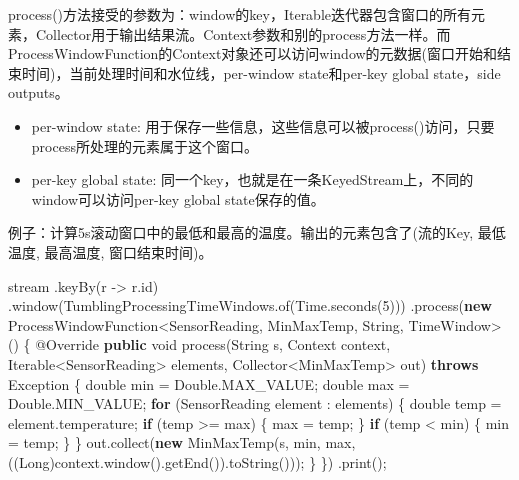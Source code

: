\documentclass[cn,11pt,chinese]{elegantbook}
\newenvironment{Shaded}{}{}
\newcommand{\AttributeTok}[1]{\textcolor[rgb]{0.49,0.56,0.16}{#1}}
\newcommand{\BuiltInTok}[1]{#1}
\newcommand{\DataTypeTok}[1]{\textcolor[rgb]{0.56,0.13,0.00}{#1}}
\newcommand{\DecValTok}[1]{\textcolor[rgb]{0.25,0.63,0.44}{#1}}
\newcommand{\FunctionTok}[1]{\textcolor[rgb]{0.02,0.16,0.49}{#1}}
\newcommand{\KeywordTok}[1]{\textcolor[rgb]{0.00,0.44,0.13}{\textbf{#1}}}
\newcommand{\NormalTok}[1]{#1}
\providecommand{\tightlist}{%
  \setlength{\itemsep}{0pt}\setlength{\parskip}{0pt}}
\begin{document}
process()方法接受的参数为：window的key，Iterable迭代器包含窗口的所有元素，Collector用于输出结果流。Context参数和别的process方法一样。而ProcessWindowFunction的Context对象还可以访问window的元数据(窗口开始和结束时间)，当前处理时间和水位线，per-window
state和per-key global state，side outputs。

\begin{itemize}
\tightlist
\item
  per-window state:
  用于保存一些信息，这些信息可以被process()访问，只要process所处理的元素属于这个窗口。
\item
  per-key global state:
  同一个key，也就是在一条KeyedStream上，不同的window可以访问per-key
  global state保存的值。
\end{itemize}

例子：计算5s滚动窗口中的最低和最高的温度。输出的元素包含了(流的Key,
最低温度, 最高温度, 窗口结束时间)。

\begin{Shaded}
\begin{Highlighting}[]
\NormalTok{stream}
\NormalTok{    .}\FunctionTok{keyBy}\NormalTok{(r {-}\textgreater{} r.}\FunctionTok{id}\NormalTok{)}
\NormalTok{    .}\FunctionTok{window}\NormalTok{(TumblingProcessingTimeWindows.}\FunctionTok{of}\NormalTok{(}\BuiltInTok{Time}\NormalTok{.}\FunctionTok{seconds}\NormalTok{(}\DecValTok{5}\NormalTok{)))}
\NormalTok{    .}\FunctionTok{process}\NormalTok{(}\KeywordTok{new}\NormalTok{ ProcessWindowFunction\textless{}SensorReading, MinMaxTemp, }\BuiltInTok{String}\NormalTok{, TimeWindow\textgreater{}() \{}
        \AttributeTok{@Override}
        \KeywordTok{public} \DataTypeTok{void} \FunctionTok{process}\NormalTok{(}\BuiltInTok{String}\NormalTok{ s, }\BuiltInTok{Context}\NormalTok{ context, }\BuiltInTok{Iterable}\NormalTok{\textless{}SensorReading\textgreater{} elements, Collector\textless{}MinMaxTemp\textgreater{} out) }\KeywordTok{throws} \BuiltInTok{Exception}\NormalTok{ \{}
            \DataTypeTok{double}\NormalTok{ min = }\BuiltInTok{Double}\NormalTok{.}\FunctionTok{MAX\_VALUE}\NormalTok{;}
            \DataTypeTok{double}\NormalTok{ max = }\BuiltInTok{Double}\NormalTok{.}\FunctionTok{MIN\_VALUE}\NormalTok{;}
            \KeywordTok{for}\NormalTok{ (SensorReading element : elements) \{}
                \DataTypeTok{double}\NormalTok{ temp = element.}\FunctionTok{temperature}\NormalTok{;}
                \KeywordTok{if}\NormalTok{ (temp \textgreater{}= max) \{}
\NormalTok{                    max = temp;}
\NormalTok{                \}}
                \KeywordTok{if}\NormalTok{ (temp \textless{} min) \{}
\NormalTok{                    min = temp;}
\NormalTok{                \}}
\NormalTok{            \}}
\NormalTok{            out.}\FunctionTok{collect}\NormalTok{(}\KeywordTok{new} \FunctionTok{MinMaxTemp}\NormalTok{(s, min, max, ((}\BuiltInTok{Long}\NormalTok{)context.}\FunctionTok{window}\NormalTok{().}\FunctionTok{getEnd}\NormalTok{()).}\FunctionTok{toString}\NormalTok{()));}
\NormalTok{        \}}
\NormalTok{    \})}
\NormalTok{    .}\FunctionTok{print}\NormalTok{();}
\end{Highlighting}
\end{Shaded}
\end{document}
